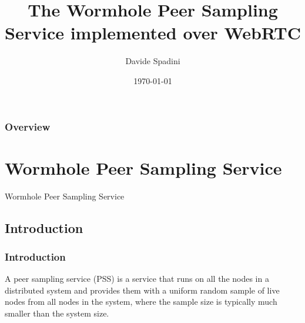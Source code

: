 \documentclass{beamer}
\title[WPSS implemented over WebRTC]{The Wormhole Peer Sampling Service implemented over WebRTC} %
\author{Davide Spadini} %
\institute[Unitn] %
{
University of Trento \\ %
\medskip
\textit{davide.spadini@unitn.it} %
}
\date{\today} %
\begin{document}
\begin{frame}
\titlepage %
\end{frame}

\begin{frame}
\frametitle{Overview} %
\tableofcontents %
\end{frame}


\section{Wormhole Peer Sampling Service} %
\begin{frame}[c]
\Huge{\centerline{Wormhole Peer Sampling Service}}

\end{frame}

\subsection{Introduction}

\begin{frame}
\frametitle{Introduction}
A peer sampling service (PSS) is a service that runs on all the nodes in a distributed system and provides them with a uniform random sample of live nodes from all nodes in the system, where the sample size is typically much smaller than the system size. 
\end{frame}
\end{document}
